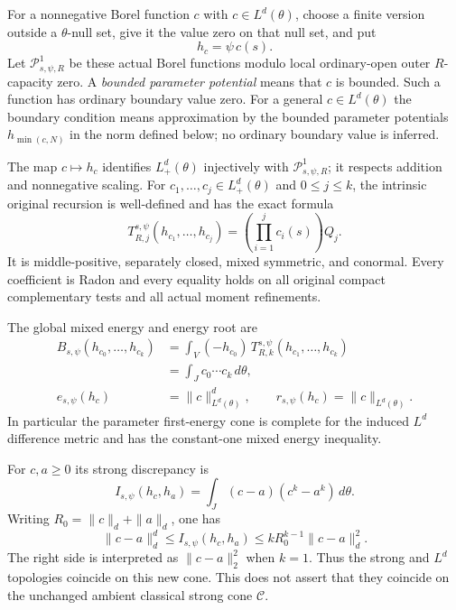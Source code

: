 \begin{definition}
For a nonnegative Borel function $c$ with
$c\in L^d(\theta)$, choose a finite version outside a
$\theta$-null set, give it the value zero on that null set,
and put
\[
                           h_c=\psi\,c(s).
 \tag{PD6}
\]
Let $\mathscr P^1_{s,\psi,R}$ be these actual Borel functions
modulo local ordinary-open outer $R$-capacity zero.
A \emph{bounded parameter potential} means that $c$ is bounded.
Such a function has ordinary boundary value zero. For a general
$c\in L^d(\theta)$ the boundary condition means approximation
by the bounded parameter potentials $h_{\min(c,N)}$ in
the norm defined below; no ordinary boundary value is inferred.
\end{definition}

\begin{theorem}
\label{thm:r12-parameter-Lp-BT}
The map $c\mapsto h_c$ identifies $L^d_+(\theta)$ injectively
with $\mathscr P^1_{s,\psi,R}$; it respects addition and
nonnegative scaling. For $c_1,\ldots,c_j\in L^d_+(\theta)$
and $0\leq j\leq k$, the intrinsic original recursion is
well-defined and has the exact formula
\[
 T^{s,\psi}_{R,j}(h_{c_1},\ldots,h_{c_j})
       =\left(\prod_{i=1}^j c_i(s)\right)Q_j.
 \tag{PD7}
\]
It is middle-positive, separately closed, mixed symmetric,
and conormal. Every coefficient is Radon and every equality
holds on all original compact complementary tests and
all actual moment refinements.

The global mixed energy and energy root are
\[
 \begin{split}
 B_{s,\psi}(h_{c_0},\ldots,h_{c_k})
       &=\int_V(-h_{c_0})\,
                 T^{s,\psi}_{R,k}(h_{c_1},\ldots,h_{c_k})\\
       &=\int_J c_0\cdots c_k\,d\theta,\\
 e_{s,\psi}(h_c)&=\|c\|_{L^d(\theta)}^d,\qquad
 r_{s,\psi}(h_c)=\|c\|_{L^d(\theta)} .
 \end{split}
 \tag{PD8}
\]
In particular the parameter first-energy cone is complete
for the induced $L^d$ difference metric and has the
constant-one mixed energy inequality.

For $c,a\geq0$ its strong discrepancy is
\[
 I_{s,\psi}(h_c,h_a)
       =\int_J(c-a)(c^k-a^k)\,d\theta.
 \tag{PD9}
\]
Writing $R_0=\|c\|_d+\|a\|_d$, one has
\[
 \|c-a\|_d^d\leq I_{s,\psi}(h_c,h_a)
       \leq kR_0^{k-1}\|c-a\|_d^2.
 \tag{PD10}
\]
The right side is interpreted as $\|c-a\|_2^2$ when $k=1$.
Thus the strong and $L^d$ topologies coincide on this new
cone. This does not assert that they coincide on the
unchanged ambient classical strong cone $\mathscr C$.
\end{theorem}

